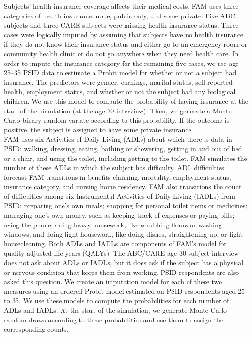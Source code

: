 \noindent Subjects' health insurance coverage affects their medical costs.
FAM uses three categories of health insurance: none, public only, and some private.
Five ABC subjects and three CARE subjects were missing health insurance status.
Three cases were logically imputed by assuming that subjects have no health insurance if they do not know their insurance status and either go to an emergency room or community health clinic or do not go anywhere when they need health care.
In order to impute the insurance category for the remaining five cases, we use age 25--35 PSID data to estimate a Probit model for whether or not a subject had insurance.
The predictors were gender, earnings, marital status, self-reported health, employment status, and whether or not the subject had any biological children.
We use this model to compute the probability of having insurance at the start of the simulation (at the age-30 interview).
Then, we generate a Monte Carlo binary random variate according to this probability.
If the outcome is positive, the subject is assigned to have some private insurance. \\

\noindent FAM uses six Activities of Daily Living (ADLs) about which there is data in PSID: walking, dressing, eating, bathing or showering, getting in and out of bed or a chair, and using the toilet, including getting to the toilet.
FAM simulates the number of these ADLs in which the subject has difficulty.
ADL difficulties forecast FAM transitions in benefits claiming, mortality, employment status, insurance category, and nursing home residency.
FAM also transitions the count of difficulties among six Instrumental Activities of Daily Living (IADLs) from PSID: preparing one's own meals; shopping for personal toilet items or medicines; managing one's own money, such as keeping track of expenses or paying bills; using the phone; doing heavy housework, like scrubbing floors or washing windows; and doing light housework, like doing dishes, straightening up, or light housecleaning.
Both ADLs and IADLs are components of FAM's model for quality-adjusted life years (QALYs).
The ABC/CARE age-30 subject interview does not ask about ADLs or IADLs, but it does ask if the subject has a physical or nervous condition that keeps them from working.
PSID respondents are also asked this question.
We create an imputation model for each of these two measures using an ordered Probit model estimated on PSID respondents aged 25 to 35.
We use these models to compute the probabilities for each number of ADLs and IADLs. At the start of the simulation, we generate Monte Carlo random draws according to these probabilities and use them to assign the corresponding counts. \\

